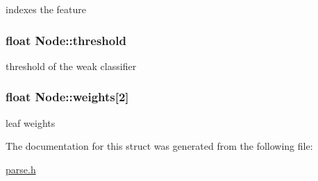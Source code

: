 indexes the feature 

\hypertarget{structNode_adb3dcfc278000adc4432b6276457e567}{}
\subsubsection[{threshold}]{\setlength{\rightskip}{0pt plus 5cm}float Node\+::threshold}\label{structNode_adb3dcfc278000adc4432b6276457e567}


threshold of the weak classifier 

\hypertarget{structNode_a0bce4167171403b9ed22eb4f26687333}{}
\subsubsection[{weights}]{\setlength{\rightskip}{0pt plus 5cm}float Node\+::weights\mbox{[}2\mbox{]}}\label{structNode_a0bce4167171403b9ed22eb4f26687333}


leaf weights 



The documentation for this struct was generated from the following file\+:\begin{DoxyCompactItemize}
\item 
\hyperlink{parse_8h}{parse.\+h}\end{DoxyCompactItemize}
